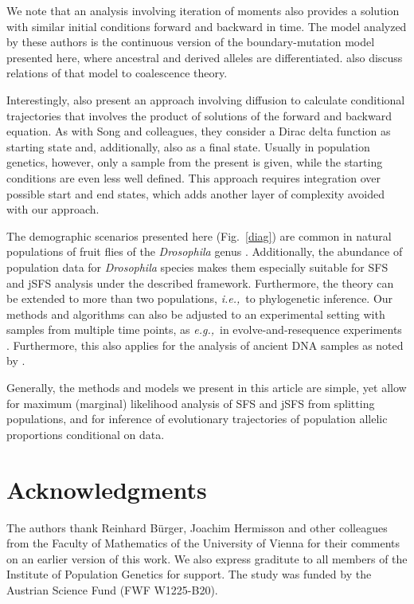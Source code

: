 \documentclass[preprint]{elsarticle}
\newcommand\eg{{\it e.g.,}}
\newcommand\ie{{\it i.e.,}}
\begin{document}
We note that an analysis involving iteration of moments \citep{Evan07,Zivk11} also provides a solution with similar initial conditions forward and backward in time. The model analyzed by these authors is the continuous version of the  boundary-mutation model presented here, where ancestral and derived alleles are differentiated. %
\citet{Zivk11} also discuss relations of that model to coalescence theory.

Interestingly, \citet{Zhao13} also present an approach involving diffusion to calculate conditional trajectories that involves the product of solutions of the forward and backward equation. As with Song and colleagues, they consider a Dirac delta function as starting state and, additionally, also as a final state. Usually in population genetics, however, only a sample from the present is given, while the starting conditions are even less well defined. This approach requires integration over possible start and end states, which adds another layer of complexity avoided with our approach. 

The demographic scenarios presented here (Fig.~\ref{diag}) are common in natural populations of fruit flies of the \textit{Drosophila} genus \citep[\eg][]{Li06,Zeng10a,Pool12}. Additionally, the abundance of population data for \textit{Drosophila} species makes them especially suitable for SFS and jSFS analysis under the described framework. Furthermore, the theory can be extended to more than two populations, \ie\ to phylogenetic inference. Our methods and algorithms can also be adjusted to an experimental setting with samples from multiple time points, as \eg\ in evolve-and-resequence experiments \citep{Kofl14}. Furthermore, this also applies for the analysis of ancient DNA samples as noted by \citet{Stei14}.

Generally, the methods and models we present in this article are simple, yet allow for maximum (marginal) likelihood analysis of SFS and jSFS from splitting populations, and for inference of evolutionary trajectories of population allelic proportions conditional on data. 

\section*{Acknowledgments}

The authors thank Reinhard B\"urger, Joachim Hermisson and other colleagues from the Faculty of Mathematics of the University of Vienna for their comments on an earlier version of this work. We also express graditute to all members of the Institute of Population Genetics for support. The study was funded by the Austrian Science Fund (FWF W1225-B20). %
\end{document}
